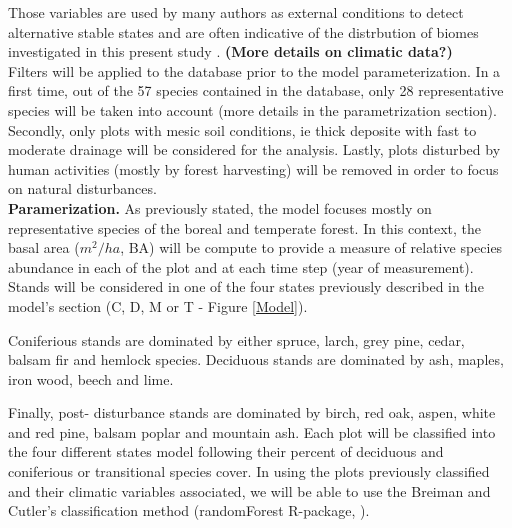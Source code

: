
Those variables are used by many
authors as external conditions to detect alternative stable states and are
often indicative of the distrbution of biomes investigated in this present
study \cite{Goldblum2010,Hirota2011,Scheffer2012}. \textbf{(More details on
climatic data?)}\\


Filters will be applied to the database prior to the model parameterization.
In a first time, out of the 57 species contained in the  database, only 28
representative species will be taken into account (more details in the
parametrization section). Secondly,  only plots with mesic soil conditions, ie
thick deposite with fast to moderate drainage will be considered for the
analysis. Lastly, plots disturbed by human activities (mostly by forest
harvesting) will be removed in order to focus on natural disturbances. \\ 



\textbf{Paramerization.} As previously stated, the model focuses mostly on
representative species of the boreal and temperate forest. In this context, the basal area ($m^2/ha$, BA) will be compute to
provide a measure of relative species abundance in each of the
plot and at each time step (year of measurement). Stands will be considered in one of the four states 
previously described in the model's
section (C, D, M or T - Figure \ref{Model}).


 Coniferious stands are dominated by either spruce, larch, grey pine, cedar,
balsam fir and hemlock species. Deciduous stands are dominated by ash, maples,
iron wood, beech and lime.


Finally, post- disturbance stands are dominated by birch, red oak, aspen,
white and red pine, balsam poplar and mountain ash. Each plot will be
classified into the four different states model following their percent of
deciduous and coniferious or transitional species cover. In using the plots
previously classified and their climatic variables associated, we will be able
to use the Breiman and Cutler's classification method (randomForest R-package,
\cite{Liaw2002a}).

